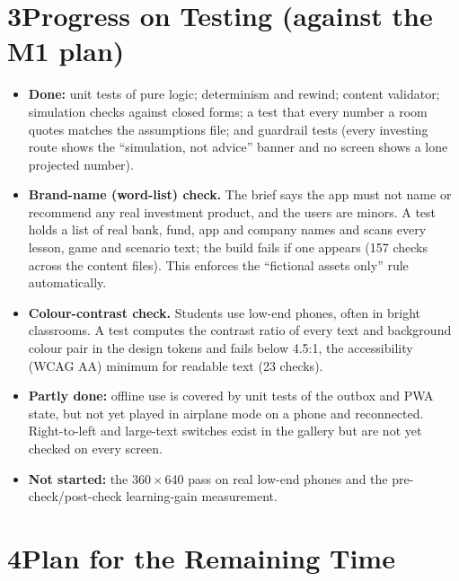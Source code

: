 \documentclass[10pt,a4paper]{article}
\begin{document}
\section*{3\quad Progress on Testing (against the M1 plan)}

\begin{itemize}
  \item \textbf{Done:} unit tests of pure logic; determinism and rewind; content validator; simulation checks against closed forms; a test that every number a room quotes matches the assumptions file; and guardrail tests (every investing route shows the ``simulation, not advice'' banner and no screen shows a lone projected number).
  \item \textbf{Brand-name (word-list) check.} The brief says the app must not name or recommend any real investment product, and the users are minors. A test holds a list of real bank, fund, app and company names and scans every lesson, game and scenario text; the build fails if one appears (157 checks across the content files). This enforces the ``fictional assets only'' rule automatically.
  \item \textbf{Colour-contrast check.} Students use low-end phones, often in bright classrooms. A test computes the contrast ratio of every text and background colour pair in the design tokens and fails below 4.5:1, the accessibility (WCAG AA) minimum for readable text (23 checks).
  \item \textbf{Partly done:} offline use is covered by unit tests of the outbox and PWA state, but not yet played in airplane mode on a phone and reconnected. Right-to-left and large-text switches exist in the gallery but are not yet checked on every screen.
  \item \textbf{Not started:} the 360\,$\times$\,640 pass on real low-end phones and the pre-check/post-check learning-gain measurement.
\end{itemize}

\section*{4\quad Plan for the Remaining Time}
\end{document}

